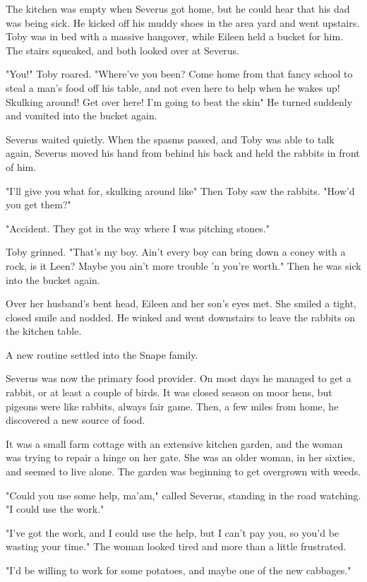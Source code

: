 The kitchen was empty when Severus got home, but he could hear that his dad was being sick. He kicked off his muddy shoes in the area yard and went upstairs. Toby was in bed with a massive hangover, while Eileen held a bucket for him. The stairs squeaked, and both looked over at Severus.

"You!" Toby roared. "Where've you been? Come home from that fancy school to steal a man's food off his table, and not even here to help when he wakes up! Skulking around! Get over here! I'm going to beat the skin{\el}" He turned suddenly and vomited into the bucket again.

Severus waited quietly. When the spasms passed, and Toby was able to talk again, Severus moved his hand from behind his back and held the rabbits in front of him.

"I'll give you what for, skulking around like{\el}" Then Toby saw the rabbits. "How'd you get them?"

"Accident. They got in the way where I was pitching stones."

Toby grinned. "That's my boy. Ain't every boy can bring down a coney with a rock, is it Leen? Maybe you ain't more trouble 'n you're worth." Then he was sick into the bucket again.

Over her husband's bent head, Eileen and her son's eyes met. She smiled a tight, closed smile and nodded. He winked and went downstairs to leave the rabbits on the kitchen table.

A new routine settled into the Snape family.

Severus was now the primary food provider. On most days he managed to get a rabbit, or at least a couple of birds. It was closed season on moor hens, but pigeons were like rabbits, always fair game. Then, a few miles from home, he discovered a new source of food.

It was a small farm cottage with an extensive kitchen garden, and the woman was trying to repair a hinge on her gate. She was an older woman, in her sixties, and seemed to live alone. The garden was beginning to get overgrown with weeds.

"Could you use some help, ma'am," called Severus, standing in the road watching. "I could use the work."

"I've got the work, and I could use the help, but I can't pay you, so you'd be wasting your time." The woman looked tired and more than a little frustrated.

"I'd be willing to work for some potatoes, and maybe one of the new cabbages."

